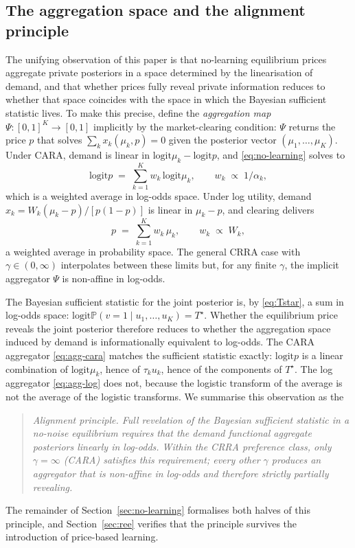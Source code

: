 \documentclass[12pt,letterpaper]{article}
\theoremstyle{definition}
\theoremstyle{remark}
\newcommand{\PP}{\mathbb{P}}
\newcommand{\logit}{\mathrm{logit}}
\newcommand{\Tstar}{T^{\!\star}}
\newcommand{\1}{\mathbf{1}}
\begin{document}
\subsection{The aggregation space and the alignment principle}\label{sec:agg-space}

The unifying observation of this paper is that no-learning equilibrium prices
aggregate private posteriors in a space determined by the linearisation of
demand, and that whether prices fully reveal private information reduces to
whether that space coincides with the space in which the Bayesian sufficient
statistic lives. To make this precise, define the \emph{aggregation map}
$\Psi:[0,1]^{K}\to[0,1]$ implicitly by the market-clearing condition: $\Psi$
returns the price $p$ that solves $\sum_{k}x_{k}(\mu_{k},p)=0$ given the
posterior vector $(\mu_{1},\ldots,\mu_{K})$. Under CARA, demand is linear in
$\logit\mu_{k}-\logit p$, and \eqref{eq:no-learning} solves to
\begin{equation}
   \logit p \;=\; \sum_{k=1}^{K} w_{k}\,\logit\mu_{k},
   \qquad w_{k} \;\propto\; 1/\alpha_{k},
\label{eq:agg-cara}
\end{equation}
which is a weighted average in log-odds space. Under log utility, demand
$x_{k}=W_{k}(\mu_{k}-p)/[p(1-p)]$ is linear in $\mu_{k}-p$, and clearing
delivers
\begin{equation}
   p \;=\; \sum_{k=1}^{K} w_{k}\,\mu_{k},
   \qquad w_{k} \;\propto\; W_{k},
\label{eq:agg-log}
\end{equation}
a weighted average in probability space. The general CRRA case with
$\gamma\in(0,\infty)$ interpolates between these limits but, for any finite
$\gamma$, the implicit aggregator $\Psi$ is non-affine in log-odds.

The Bayesian sufficient statistic for the joint posterior is, by
\eqref{eq:Tstar}, a sum in log-odds space:
$\logit\PP(v=1\mid u_{1},\ldots,u_{K})=\Tstar$. Whether the equilibrium
price reveals the joint posterior therefore reduces to whether the
aggregation space induced by demand is informationally equivalent to
log-odds. The CARA aggregator \eqref{eq:agg-cara} matches the sufficient
statistic exactly: $\logit p$ is a linear combination of $\logit\mu_{k}$,
hence of $\tau_{k}u_{k}$, hence of the components of $\Tstar$. The log
aggregator \eqref{eq:agg-log} does not, because the logistic transform of
the average is not the average of the logistic transforms. We summarise
this observation as the
\begin{quote}
\itshape Alignment principle. Full revelation of the Bayesian sufficient
statistic in a no-noise equilibrium requires that the demand functional
aggregate posteriors linearly in log-odds. Within the CRRA preference
class, only $\gamma=\infty$ (CARA) satisfies this requirement; every
other $\gamma$ produces an aggregator that is non-affine in log-odds and
therefore strictly partially revealing.
\end{quote}
The remainder of Section~\ref{sec:no-learning} formalises both halves of
this principle, and Section~\ref{sec:ree} verifies that the principle
survives the introduction of price-based learning.
\end{document}
